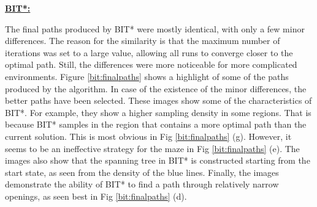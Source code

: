 \documentclass{article}
\newcommand*{\varfont}{\fontfamily{pcr}\selectfont}
\begin{document}
\textbf{\underline{BIT*:}}

The final paths produced by BIT* were mostly identical, with only a few minor differences. The reason for the similarity is that the maximum number of iterations was set to a large value, allowing all runs to converge closer to the optimal path. Still, the differences were more noticeable for more complicated environments. Figure \ref{bit:finalpaths} shows a highlight of some of the paths produced by the algorithm. In case of the existence of the minor differences, the better paths have been selected. These images show some of the characteristics of BIT*. For example, they show a higher sampling density in some regions. That is because BIT* samples in the region that contains a more optimal path than the current solution. This is most obvious in Fig \ref{bit:finalpaths} (g). However, it seems to be an ineffective strategy for the maze in Fig \ref{bit:finalpaths} (e). The images also show that the spanning tree in BIT* is constructed starting from the {\varfont start} state, as seen from the density of the blue lines. Finally, the images demonstrate the ability of BIT* to find a path through relatively narrow openings, as seen best in Fig \ref{bit:finalpaths} (d).
\end{document}

